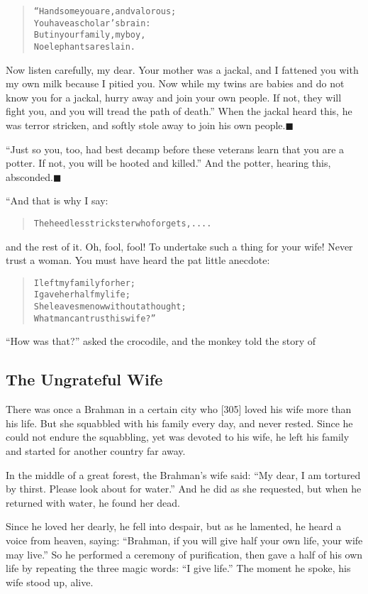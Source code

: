\documentclass[article, twoside, 14pt]{memoir}
\newcommand{\qed}{\hfill \ensuremath{\blacksquare}}
\renewenvironment{verbatim}{%
\begin{quote}%
\vskip -10pt%
\begin{alltt}\normalfont\large}{\end{alltt}%
\end{quote}%
\vskip -10pt
} %
\begin{document}
\begin{verbatim}
“Handsome you are, and valorous;
    You have a scholar's brain:
But in your family, my boy,
    No elephants are slain.
\end{verbatim}
Now listen carefully, my dear. Your mother was a jackal, and I
fattened you with my own milk because I pitied you. Now while my
twins are babies and do not know you for a jackal, hurry away and
join your own people. If not, they will fight you, and you will
tread the path of death.” When the jackal heard this, he was terror
stricken, and softly stole away to join his own
people.\hyperref[s70]{\qed}

``Just so you, too, had best decamp before these veterans learn that you are a potter. If not, you will be hooted and killed.''
And the potter, hearing this, absconded.\hyperref[s69]{\qed}

“And that is why I say:

\begin{verbatim}
The heedless trickster who forgets, ....
\end{verbatim}
and the rest of it. Oh, fool, fool! To undertake such a thing for
your wife! Never trust a woman. You must have heard the pat little
anecdote:

\begin{verbatim}
I left my family for her;
    I gave her half my life;
She leaves me now without a thought;
    What man can trust his wife?”
\end{verbatim}
``How was that?'' asked the crocodile, and the monkey told the
story of

\subsection{The Ungrateful Wife}

\label{s71}

There was once a Brahman in a certain city who [305] loved his wife
more than his life. But she squabbled with his family every day,
and never rested. Since he could not endure the squabbling, yet was
devoted to his wife, he left his family and started for another
country far away.

In the middle of a great forest, the Brahman's wife said:
``My dear, I am tortured by thirst. Please look about for water.''
And he did as she requested, but when he returned with water, he
found her dead.

Since he loved her dearly, he fell into despair, but as he
lamented, he heard a voice from heaven, saying:
``Brahman, if you will give half your own life, your wife may live.''
So he performed a ceremony of purification, then gave a half of his
own life by repeating the three magic words: ``I give life.'' The
moment he spoke, his wife stood up, alive.
\end{document}
